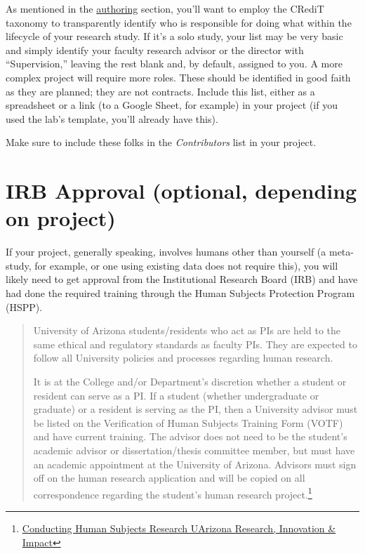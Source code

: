 \documentclass[]{tufte-book}
\begin{document}
As mentioned in the \protect\hyperlink{authorship}{authoring} section, you'll want to employ the CRediT taxonomy to transparently identify who is responsible for doing what within the lifecycle of your research study. If it's a solo study, your list may be very basic and simply identify your faculty research advisor or the director with ``Supervision,'' leaving the rest blank and, by default, assigned to you. A more complex project will require more roles. These should be identified in good faith as they are planned; they are not contracts. Include this list, either as a spreadsheet or a link (to a Google Sheet, for example) in your project (if you used the lab's template, you'll already have this).

Make sure to include these folks in the \emph{Contributors} list in your project.

\hypertarget{irb-approval-optional-depending-on-project}{%
\section{IRB Approval (optional, depending on project)}\label{irb-approval-optional-depending-on-project}}

If your project, generally speaking, involves humans other than yourself (a meta-study, for example, or one using existing data does not require this), you will likely need to get approval from the Institutional Research Board (IRB) and have had done the required training through the Human Subjects Protection Program (HSPP).

\begin{quote}
University of Arizona students/residents who act as PIs are held to the same ethical and regulatory standards as faculty PIs. They are expected to follow all University policies and processes regarding human research.

It is at the College and/or Department's discretion whether a student or resident can serve as a PI. If a student (whether undergraduate or graduate) or a resident is serving as the PI, then a University advisor must be listed on the Verification of Human Subjects Training Form (VOTF) and have current training. The advisor does not need to be the student's academic advisor or dissertation/thesis committee member, but must have an academic appointment at the University of Arizona. Advisors must sign off on the human research application and will be copied on all correspondence regarding the student's human research project.\footnote{\href{https://research.arizona.edu/administration/getting-started/Principal-Investigator-Eligibility/conducting-human-subjects-research}{Conducting Human Subjects Research \textbar{} UArizona Research, Innovation \& Impact}}
\end{quote}
\end{document}

